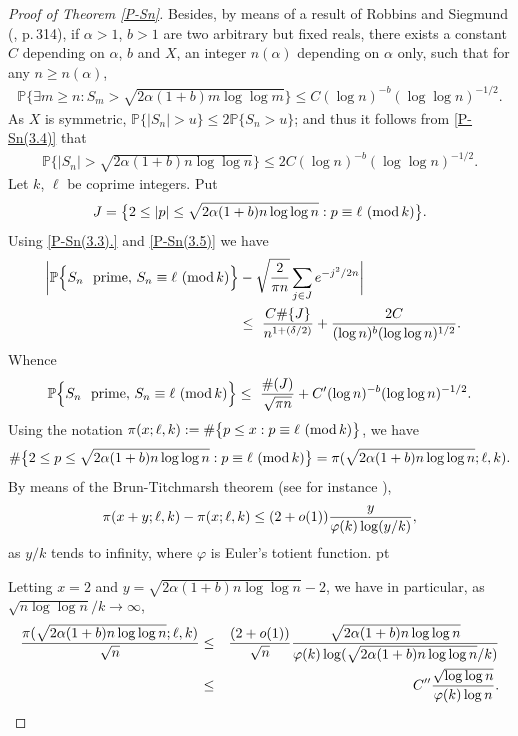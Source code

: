 \documentclass[11pt,draft,reqno]{amsart}
\theoremstyle{definition}
\theoremstyle{remarks}
\numberwithin{equation}{section}
\def \a{{\alpha}}
\def \d{{\delta}}
\def\P{{\mathcal P}}
\def\P{{\mathbb P}}
\begin{document}
\begin{proof}[Proof of Theorem \ref{P-Sn}]
Besides, by means of a result of  Robbins and Siegmund (\cite{P}, p.\,314), if $\a>1$, $b>1$ are two arbitrary but fixed reals,
there exists a constant $C$ depending on   $\a$, $b$ and $X$, an integer  $n(\a)$ depending on  $\a$ only, such that for any $n\ge
n(\a)$,
\begin{align}\label{P-Sn(3.4)} \P\Big\{ \exists m\ge n : S_m>\sqrt{2\a(1+b)m  \log\log m}\Big\}\le C (\log n)^{-b} (\log\log n)^{-1/2}.
\end{align}
As  $X$ is symmetric, $\P\{|S_n|>u\}\le 2\P\{ S_n >u\}$; and thus it follows from  \eqref{P-Sn(3.4)} that 
\begin{align}\label{P-Sn(3.5)} \P\Big\{  |S_n|>\sqrt{2\a(1+b)n  \log\log n}\Big\}\le 2C (\log n)^{-b} (\log\log n)^{-1/2}.\end{align}
 Let  $k$, $\ell$
be coprime integers. Put
$$J=\big\{2\le |p|\le \sqrt{2\a(1+b)n  \log\log n}: p\equiv \ell \ ({\rm mod}\,
k)\big\} .$$  
Using \eqref{P-Sn(3.3).} and \eqref{P-Sn(3.5)} we have
\begin{align}\label{P-Sn(3.6)} \bigg| \P\Big\{S_n \ \hbox{ prime},\,  S_n\equiv \ell \ ({\rm mod}\, k)\Big\}&- \sqrt{2\over       \pi n }\sum_{j\in J}e^ {-  { j^2
/  2n  }  }\bigg| \cr &\le  \  {C\#\{J\}\over   n^{1+(\d/2)}}+  {2C\over (\log n)^{ b} (\log\log n)^{ 1/2}}.
\end{align}
Whence
\begin{align}\label{P-Sn(3.7)} \P\Big\{S_n \ \hbox{ prime},\, S_n\equiv \ell \ ({\rm mod}\, k)\Big\}\le\   {\#(J)\over      \sqrt{ \pi n} }   + C' (\log n)^{-b}
(\log\log n)^{-1/2}.\end{align}
Using the notation  $\pi(x;\ell, k):= \#\big\{p\le x: p\equiv \ell \ ({\rm mod}\, k)\big\} $, we have
 $$    \#\big\{2\le  p \le
\sqrt{2\a(1+b)n  \log\log n}:  p\equiv \ell \ ({\rm mod}\, k) \big\}  =  \pi(\sqrt{2\a(1+b)n  \log\log n};\ell, k)  . $$ 
By means of  the Brun-Titchmarsh theorem (see for instance \cite[p.\,83]{Te1}), 
$$\pi(x+y;\ell, k)-\pi(x;\ell, k) \le (2+o(1)) {y\over \varphi(k)\log (y/k)},
$$
 as $y/k$ tends to infinity, where  $\varphi$ is Euler's totient function.  pt 
 
 Letting $x=2$ and $y=\sqrt{2\a(1+b)n  \log\log n} -2$,  we have in particular, as   $
\sqrt{ n  \log\log n}/k\to
\infty$, 
\begin{eqnarray}\label{P-Sn(3.8)} {\pi(\sqrt{2\a(1+b)n  \log\log n};\ell, k)\over \sqrt
  n}&\le& { (2+o(1)) \over \sqrt
  n}  {\sqrt{2\a(1+b)n  \log\log n}\over \varphi(k)\log  (\sqrt{2\a(1+b)n  \log\log n}/k)   }\cr &\le  &C''   {\sqrt{   
\log\log n}\over \varphi(k)\log    n   }.
\end{eqnarray}


\end{proof}
\end{document}
